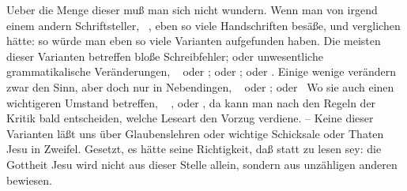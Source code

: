  Ueber die Menge dieser  muß man sich nicht wundern. Wenn man von irgend einem andern Schriftsteller, \zB\ , eben so viele Handschriften besäße, und verglichen hätte: so würde man eben so viele Varianten aufgefunden haben. Die meisten dieser Varianten betreffen bloße Schreibfehler; oder unwesentliche grammatikalische Veränderungen, \zB\  oder ;  oder ;  oder . Einige wenige verändern zwar den Sinn, aber doch nur in Nebendingen, \zB\  oder ;   oder  \udgl\  Wo sie auch einen wichtigeren Umstand betreffen, \zB\  , oder  , da kann man nach den Regeln der Kritik bald entscheiden, welche Leseart den Vorzug verdiene. -- Keine dieser Varianten läßt uns über Glaubenslehren oder wichtige Schicksale oder Thaten Jesu in Zweifel. Gesetzt, es hätte seine Richtigkeit, daß   statt  zu lesen sey: die Gottheit Jesu wird nicht aus dieser Stelle allein, sondern aus unzähligen anderen bewiesen.


